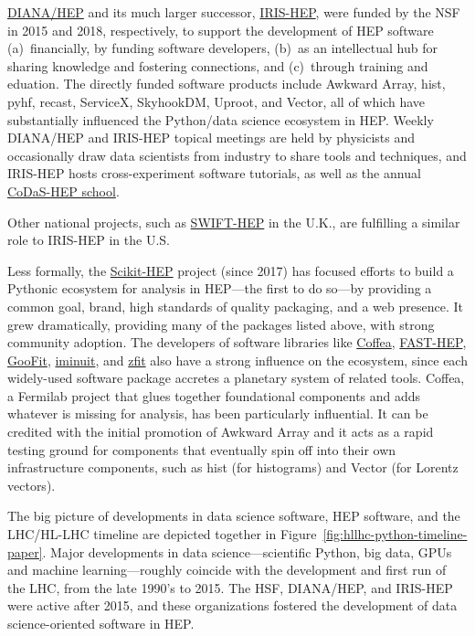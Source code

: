 \documentclass{article}
\begin{document}
\href{http://diana-hep.org/}{DIANA/HEP} and its much larger successor, \href{https://iris-hep.org/}{IRIS-HEP}, were funded by the NSF in 2015 and 2018, respectively, to support the development of HEP software (a)~financially, by funding software developers, (b)~as an intellectual hub for sharing knowledge and fostering connections, and (c)~through training and eduation. The directly funded software products include Awkward Array, hist, pyhf, recast, ServiceX, SkyhookDM, Uproot, and Vector, all of which have substantially influenced the Python/data science ecosystem in HEP. Weekly DIANA/HEP and IRIS-HEP topical meetings are held by physicists and occasionally draw data scientists from industry to share tools and techniques, and IRIS-HEP hosts cross-experiment software tutorials, as well as the annual \href{http://codas-hep.org/}{CoDaS-HEP school}.

Other national projects, such as \href{https://gtr.ukri.org/projects?ref=ST\%2FV002562\%2F1}{SWIFT-HEP} in the U.K., are fulfilling a similar role to IRIS-HEP in the U.S.

Less formally, the \href{https://scikit-hep.org/}{Scikit-HEP} project (since 2017) has focused efforts to build a Pythonic ecosystem for analysis in HEP---the first to do so---by providing a common goal, brand, high standards of quality packaging, and a web presence. It grew dramatically, providing many of the packages listed above, with strong community adoption. The developers of software libraries like \href{https://coffeateam.github.io/coffea/}{Coffea}, \href{https://fast-hep.web.cern.ch/fast-hep/}{FAST-HEP}, \href{https://goofit.github.io/}{GooFit}, \href{https://iminuit.readthedocs.io/}{iminuit}, and \href{https://zfit.readthedocs.io/en/latest/}{zfit} also have a strong influence on the ecosystem, since each widely-used software package accretes a planetary system of related tools. Coffea, a Fermilab project that glues together foundational components and adds whatever is missing for analysis, has been particularly influential. It can be credited with the initial promotion of Awkward Array and it acts as a rapid testing ground for components that eventually spin off into their own infrastructure components, such as hist (for histograms) and Vector (for Lorentz vectors).

The big picture of developments in data science software, HEP software, and the LHC/HL-LHC timeline are depicted together in Figure~\ref{fig:hllhc-python-timeline-paper}. Major developments in data science---scientific Python, big data, GPUs and machine learning---roughly coincide with the development and first run of the LHC, from the late 1990's to 2015. The HSF, DIANA/HEP, and IRIS-HEP were active after 2015, and these organizations fostered the development of data science-oriented software in HEP.
\end{document}
